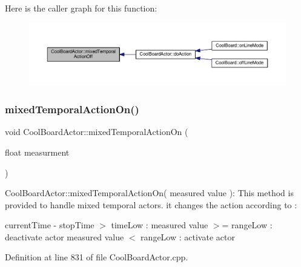 Here is the caller graph for this function\+:
\nopagebreak
\begin{figure}[H]
\begin{center}
\leavevmode
\includegraphics[width=350pt]{dc/d69/class_cool_board_actor_a00b29c4abf0388551aa6812372113cf1_icgraph}
\end{center}
\end{figure}
\mbox{\label{class_cool_board_actor_a216aa7a0cfd1f31d0025cc91c2ecd5dd}} 
\subsubsection{\texorpdfstring{mixed\+Temporal\+Action\+On()}{mixedTemporalActionOn()}}
{\footnotesize\ttfamily void Cool\+Board\+Actor\+::mixed\+Temporal\+Action\+On (\begin{DoxyParamCaption}\item[{float}]{measurment }\end{DoxyParamCaption})}

Cool\+Board\+Actor\+::mixed\+Temporal\+Action\+On( measured value )\+: This method is provided to handle mixed temporal actors. it changes the action according to \+:

current\+Time -\/ stop\+Time $>$ time\+Low \+: measured value $>$= range\+Low \+: deactivate actor measured value $<$ range\+Low \+: activate actor 

Definition at line 831 of file Cool\+Board\+Actor.\+cpp.


